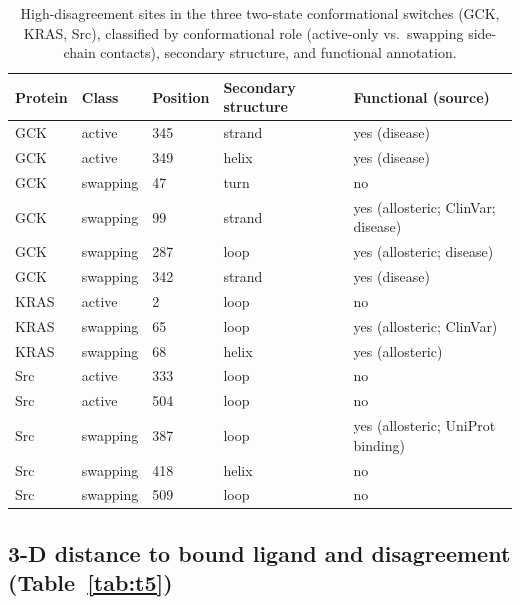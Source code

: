 \documentclass{article}
\begin{document}
\begin{table}[h]
  \caption{High-disagreement sites in the three two-state conformational switches (GCK, KRAS, Src), classified by conformational role (active-only vs.\ swapping side-chain contacts), secondary structure, and functional annotation.}
  \label{tab:t4}
  \centering
  \footnotesize
  \begin{tabular}{lllll}
    \toprule
    Protein & Class & Position & Secondary structure & Functional (source) \\
    \midrule
    GCK  & active   & 345 & strand & yes (disease) \\
    GCK  & active   & 349 & helix  & yes (disease) \\
    GCK  & swapping & 47  & turn   & no \\
    GCK  & swapping & 99  & strand & yes (allosteric; ClinVar; disease) \\
    GCK  & swapping & 287 & loop   & yes (allosteric; disease) \\
    GCK  & swapping & 342 & strand & yes (disease) \\
    KRAS & active   & 2   & loop   & no \\
    KRAS & swapping & 65  & loop   & yes (allosteric; ClinVar) \\
    KRAS & swapping & 68  & helix  & yes (allosteric) \\
    Src  & active   & 333 & loop   & no \\
    Src  & active   & 504 & loop   & no \\
    Src  & swapping & 387 & loop   & yes (allosteric; UniProt binding) \\
    Src  & swapping & 418 & helix  & no \\
    Src  & swapping & 509 & loop   & no \\
    \bottomrule
  \end{tabular}
\end{table}
\FloatBarrier

\subsection{3-D distance to bound ligand and disagreement (Table~\ref{tab:t5})}
\end{document}
